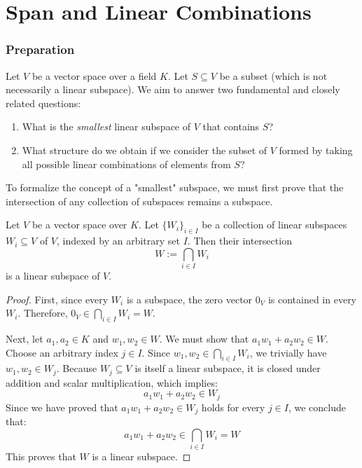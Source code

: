 

\usetikzlibrary{positioning}  %
\usetikzlibrary{arrows.meta}  %
\usetikzlibrary{shapes}       %
\setcounter{chapter}{7}
\renewcommand{\thetheorem}{\thechapter.\arabic{theorem}}
\setcounter{theorem}{0}

\chapter{Span and Linear Combinations}

\subsection{Preparation}

Let $V$ be a vector space over a field $K$. Let $S \subseteq V$ be a subset (which is not necessarily a linear subspace). We aim to answer two fundamental and closely related questions:
\begin{enumerate}
    \item What is the \textit{smallest} linear subspace of $V$ that contains $S$?
    \item What structure do we obtain if we consider the subset of $V$ formed by taking all possible linear combinations of elements from $S$?
\end{enumerate}

To formalize the concept of a "smallest" subspace, we must first prove that the intersection of any collection of subspaces remains a subspace.

\begin{lemma}
Let $V$ be a vector space over $K$. Let $\{W_i\}_{i \in I}$ be a collection of linear subspaces $W_i \subseteq V$ of $V$, indexed by an arbitrary set $I$. Then their intersection
\[
W := \bigcap_{i \in I} W_i
\]
is a linear subspace of $V$.
\end{lemma}

\begin{proof}
First, since every $W_i$ is a subspace, the zero vector $0_V$ is contained in every $W_i$. Therefore, $0_V \in \bigcap_{i \in I} W_i = W$.

Next, let $a_1, a_2 \in K$ and $w_1, w_2 \in W$. We must show that $a_1 w_1 + a_2 w_2 \in W$. 
Choose an arbitrary index $j \in I$. Since $w_1, w_2 \in \bigcap_{i \in I} W_i$, we trivially have $w_1, w_2 \in W_j$. Because $W_j \subseteq V$ is itself a linear subspace, it is closed under addition and scalar multiplication, which implies:
\[
a_1 w_1 + a_2 w_2 \in W_j
\]
Since we have proved that $a_1 w_1 + a_2 w_2 \in W_j$ holds for every $j \in I$, we conclude that:
\[
a_1 w_1 + a_2 w_2 \in \bigcap_{i \in I} W_i = W
\]
This proves that $W$ is a linear subspace.
\end{proof}

